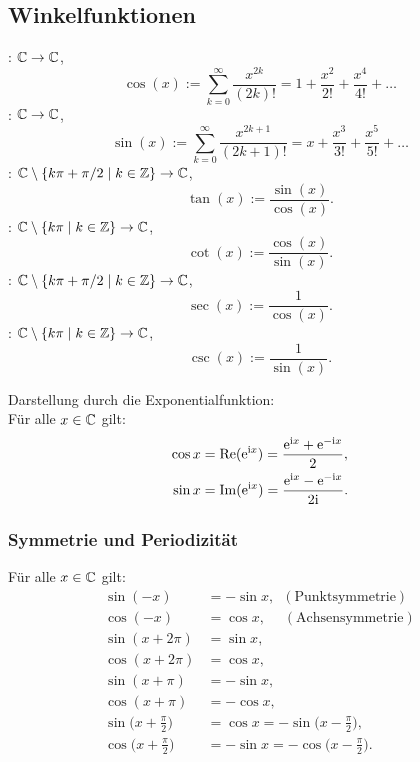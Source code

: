 \subsection{Winkelfunktionen}
\begin{Definition}
: $\mathbb C\to\mathbb C$,
\begin{equation}
\cos(x) := \sum_{k=0}^\infty \frac{x^{2k}}{(2k)!}
= 1+\frac{x^2}{2!}+\frac{x^4}{4!}+\ldots
\end{equation}
: $\mathbb C\to\mathbb C$,
\begin{equation}
\sin(x) := \sum_{k=0}^\infty \frac{x^{2k+1}}{(2k+1)!}
= x+\frac{x^3}{3!}+\frac{x^5}{5!}+\ldots
\end{equation}
: $\mathbb C\setminus\{k\pi+\pi/2\mid k\in\mathbb Z\}\to\mathbb C$,
\begin{equation}
\tan(x) := \frac{\sin(x)}{\cos(x)}.
\end{equation}
: $\mathbb C\setminus\{k\pi\mid k\in\mathbb Z\}\to\mathbb C$,
\begin{equation}
\cot(x) := \frac{\cos(x)}{\sin(x)}.
\end{equation}
: $\mathbb C\setminus\{k\pi+\pi/2\mid k\in\mathbb Z\}\to\mathbb C$,
\begin{equation}
\sec(x) := \frac{1}{\cos(x)}.
\end{equation}
: $\mathbb C\setminus\{k\pi\mid k\in\mathbb Z\}\to\mathbb C$,
\begin{equation}
\csc(x) := \frac{1}{\sin(x)}.
\end{equation}
\end{Definition}
\noindent
Darstellung durch die Exponentialfunktion:\\
Für alle $x\in\mathbb C$ gilt:
\begin{align}
\cos x &= \operatorname*{Re}(\mathrm e^{\mathrm i x}) = \frac{\mathrm e^{\mathrm i x}+\mathrm e^{-\mathrm i x}}{2},\\
\sin x &= \operatorname*{Im}(\mathrm e^{\mathrm i x}) = \frac{\mathrm e^{\mathrm i x}-\mathrm e^{-\mathrm i x}}{2\mathrm i}.
\end{align}

\subsubsection{Symmetrie und Periodizität}
Für alle $x\in\mathbb C$ gilt:
\begin{align}
\sin(-x) &= -\sin x,\enspace(\text{Punktsymmetrie})\\
\cos(-x) &= \cos x,\quad\;(\text{Achsensymmetrie})\\
\sin(x+2\pi) &= \sin x,\\
\cos(x+2\pi) &= \cos x,\\
\sin(x+\pi)  &=-\sin x,\\
\cos(x+\pi)  &=-\cos x,\\
\sin\Big(x+\frac{\pi}{2}\Big) &= \cos x = -\sin\Big(x-\frac{\pi}{2}\Big),\\
\cos\Big(x+\frac{\pi}{2}\Big) &= -\sin x = -\cos\Big(x-\frac{\pi}{2}\Big).
\end{align}

